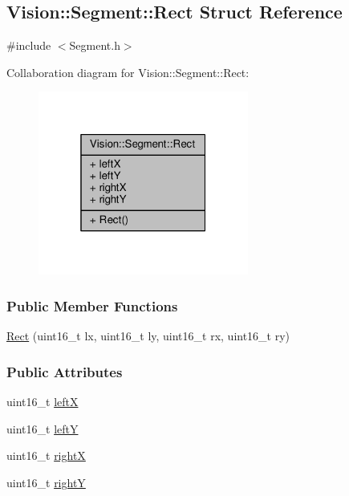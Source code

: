\hypertarget{struct_vision_1_1_segment_1_1_rect}{}\subsection{Vision\+:\+:Segment\+:\+:Rect Struct Reference}
\label{struct_vision_1_1_segment_1_1_rect}


{\ttfamily \#include $<$Segment.\+h$>$}



Collaboration diagram for Vision\+:\+:Segment\+:\+:Rect\+:
\nopagebreak
\begin{figure}[H]
\begin{center}
\leavevmode
\includegraphics[width=196pt]{struct_vision_1_1_segment_1_1_rect__coll__graph}
\end{center}
\end{figure}
\subsubsection*{Public Member Functions}
\begin{DoxyCompactItemize}
\item 
\hyperlink{struct_vision_1_1_segment_1_1_rect_acfc8bc65045c6d7d6949f11db26c248a}{Rect} (uint16\+\_\+t lx, uint16\+\_\+t ly, uint16\+\_\+t rx, uint16\+\_\+t ry)
\end{DoxyCompactItemize}
\subsubsection*{Public Attributes}
\begin{DoxyCompactItemize}
\item 
uint16\+\_\+t \hyperlink{struct_vision_1_1_segment_1_1_rect_acf3a2a045d75348971e57df5eeb7808e}{left\+X}
\item 
uint16\+\_\+t \hyperlink{struct_vision_1_1_segment_1_1_rect_ac6d22f96862077f159abc7e1accc20ab}{left\+Y}
\item 
uint16\+\_\+t \hyperlink{struct_vision_1_1_segment_1_1_rect_a6de0dfefe6b8360ee4d57027d1fba928}{right\+X}
\item 
uint16\+\_\+t \hyperlink{struct_vision_1_1_segment_1_1_rect_ab1a913248c715c25362c478498246983}{right\+Y}
\end{DoxyCompactItemize}


